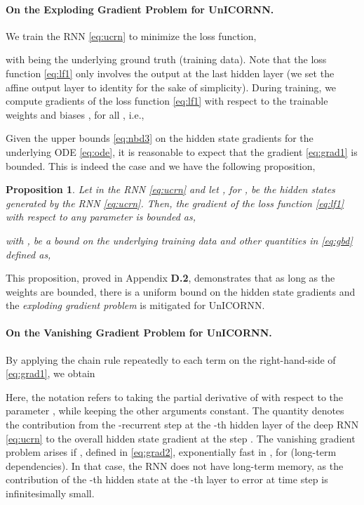\documentclass[a4paper]{article}
\newtheorem{proposition}[theorem]{Proposition}
\begin{document}
\paragraph{On the Exploding Gradient Problem for UnICORNN.} We train the RNN \eqref{eq:ucrn} to minimize the loss function,

with  being the underlying ground truth (training data). Note that the loss function \eqref{eq:lf1} only involves the output at the last hidden layer (we set the affine output layer to identity for the sake of simplicity). During training, we compute gradients of the loss function \eqref{eq:lf1} with respect to the trainable weights and biases , for all , i.e.,
 
Given the upper bounds \eqref{eq:nbd3} on the hidden state gradients for the underlying ODE \eqref{eq:ode}, it is reasonable to expect that the gradient \eqref{eq:grad1} is bounded. This is indeed the case and we have the following proposition,
\begin{proposition}
\label{prop:3}
Let  in the RNN \eqref{eq:ucrn} and let , for , be the hidden states generated by the RNN \eqref{eq:ucrn}. Then, the gradient of the loss function  \eqref{eq:lf1} with respect to any parameter  is bounded as,

with , be a bound on the underlying training data and other quantities in \eqref{eq:gbd} defined as,

\end{proposition}
This proposition, proved in Appendix {\bf D.2}, demonstrates that as long as the weights  are bounded, there is a uniform bound on the hidden state gradients and the \emph{exploding gradient problem} is mitigated for UnICORNN.
\paragraph{On the Vanishing Gradient Problem for UnICORNN.}
By applying the chain rule repeatedly to each term on the right-hand-side of \eqref{eq:grad1}, we obtain 

Here, the notation  refers to taking the partial derivative of  with respect to the parameter , while keeping the other arguments constant.  The quantity  denotes the contribution from the -recurrent step at the -th hidden layer of the deep RNN \eqref{eq:ucrn} to the overall hidden state gradient at the step . The vanishing gradient problem \citep{vanish_grad} arises if , defined in \eqref{eq:grad2},  exponentially fast in , for  (long-term dependencies). In that case, the RNN does not have long-term memory, as the contribution of the -th hidden state at the -th layer to error at time step  is infinitesimally small.
\end{document}
